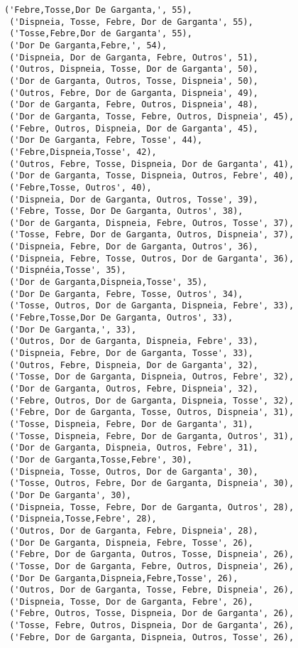 \documentclass[11pt]{article}
\begin{document}
\begin{tcolorbox}[breakable, size=fbox, boxrule=.5pt, pad at break*=1mm, opacityfill=0]
\begin{Verbatim}[commandchars=\\\{\}]
 ('Febre,Tosse,Dor De Garganta,', 55),
 ('Dispneia, Tosse, Febre, Dor de Garganta', 55),
 ('Tosse,Febre,Dor de Garganta', 55),
 ('Dor De Garganta,Febre,', 54),
 ('Dispneia, Dor de Garganta, Febre, Outros', 51),
 ('Outros, Dispneia, Tosse, Dor de Garganta', 50),
 ('Dor de Garganta, Outros, Tosse, Dispneia', 50),
 ('Outros, Febre, Dor de Garganta, Dispneia', 49),
 ('Dor de Garganta, Febre, Outros, Dispneia', 48),
 ('Dor de Garganta, Tosse, Febre, Outros, Dispneia', 45),
 ('Febre, Outros, Dispneia, Dor de Garganta', 45),
 ('Dor De Garganta, Febre, Tosse', 44),
 ('Febre,Dispneia,Tosse', 42),
 ('Outros, Febre, Tosse, Dispneia, Dor de Garganta', 41),
 ('Dor de Garganta, Tosse, Dispneia, Outros, Febre', 40),
 ('Febre,Tosse, Outros', 40),
 ('Dispneia, Dor de Garganta, Outros, Tosse', 39),
 ('Febre, Tosse, Dor De Garganta, Outros', 38),
 ('Dor de Garganta, Dispneia, Febre, Outros, Tosse', 37),
 ('Tosse, Febre, Dor de Garganta, Outros, Dispneia', 37),
 ('Dispneia, Febre, Dor de Garganta, Outros', 36),
 ('Dispneia, Febre, Tosse, Outros, Dor de Garganta', 36),
 ('Dispnéia,Tosse', 35),
 ('Dor de Garganta,Dispneia,Tosse', 35),
 ('Dor De Garganta, Febre, Tosse, Outros', 34),
 ('Tosse, Outros, Dor de Garganta, Dispneia, Febre', 33),
 ('Febre,Tosse,Dor De Garganta, Outros', 33),
 ('Dor De Garganta,', 33),
 ('Outros, Dor de Garganta, Dispneia, Febre', 33),
 ('Dispneia, Febre, Dor de Garganta, Tosse', 33),
 ('Outros, Febre, Dispneia, Dor de Garganta', 32),
 ('Tosse, Dor de Garganta, Dispneia, Outros, Febre', 32),
 ('Dor de Garganta, Outros, Febre, Dispneia', 32),
 ('Febre, Outros, Dor de Garganta, Dispneia, Tosse', 32),
 ('Febre, Dor de Garganta, Tosse, Outros, Dispneia', 31),
 ('Tosse, Dispneia, Febre, Dor de Garganta', 31),
 ('Tosse, Dispneia, Febre, Dor de Garganta, Outros', 31),
 ('Dor de Garganta, Dispneia, Outros, Febre', 31),
 ('Dor de Garganta,Tosse,Febre', 30),
 ('Dispneia, Tosse, Outros, Dor de Garganta', 30),
 ('Tosse, Outros, Febre, Dor de Garganta, Dispneia', 30),
 ('Dor De Garganta', 30),
 ('Dispneia, Tosse, Febre, Dor de Garganta, Outros', 28),
 ('Dispneia,Tosse,Febre', 28),
 ('Outros, Dor de Garganta, Febre, Dispneia', 28),
 ('Dor De Garganta, Dispneia, Febre, Tosse', 26),
 ('Febre, Dor de Garganta, Outros, Tosse, Dispneia', 26),
 ('Tosse, Dor de Garganta, Febre, Outros, Dispneia', 26),
 ('Dor De Garganta,Dispneia,Febre,Tosse', 26),
 ('Outros, Dor de Garganta, Tosse, Febre, Dispneia', 26),
 ('Dispneia, Tosse, Dor de Garganta, Febre', 26),
 ('Febre, Outros, Tosse, Dispneia, Dor de Garganta', 26),
 ('Tosse, Febre, Outros, Dispneia, Dor de Garganta', 26),
 ('Febre, Dor de Garganta, Dispneia, Outros, Tosse', 26),

\end{Verbatim}
\end{tcolorbox}
\end{document}

